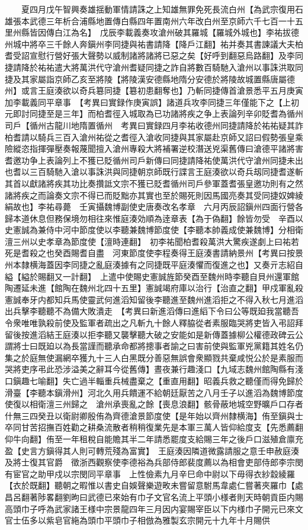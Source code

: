 　　夏四月戊午智興奏雄揺動軍情請誅之上知雄無罪免死長流白州【為武宗復用石雄張本武德三年析合浦縣地置傳白縣四年置南州六年改白州至京師六千七百一十五里州縣皆因傳白江為名】　戊辰李載義奏攻滄州破其羅城【羅城外城也】李祐拔德州城中將卒三千餘人奔鎭州李同捷與祐書請降【降戶江翻】祐并奏其書諫議大夫柏耆受詔宣慰行營好張大聲勢以威制諸將諸將已惡之矣【好呼到翻惡烏路翻】及李同捷請降於祐祐遣大將萬洪代守滄州耆疑同捷之詐自將數百騎馳入滄州以事誅洪取同捷及其家屬詣京師乙亥至將陵【將陵漢安德縣地隋分安德於將陵故城置縣唐屬德州】或言王庭湊欲以奇兵簒同捷【簒初患翻奪也】乃斬同捷傳首滄景悉平五月庚寅加李載義同平章事　【考異曰實録作庚寅誤】諸道兵攻李同捷三年僅能下之【上初元即討同捷至是三年】而柏耆徑入城取為已功諸將疾之争上表論列辛卯貶耆為循州司戶【循州古龍川地隋置循州　考異曰實録四月李祐收德州同捷請降於祐祐疑其詐柏耆請以騎兵三百入滄州祐從之耆徑入滄收同捷與其家屬赴京師又詔曰假勢張皇乘險縱恣指揮彈壓奏報蔑聞擅入滄州專殺大將補署逆校潛送兇渠舊傳曰滄德平諸將害耆邀功争上表論列上不獲已貶循州司戶新傳曰同捷請降祐使萬洪代守滄州同捷未出也耆以三百騎馳入滄以事誅洪與同捷朝京師既行諜言王庭湊欲以奇兵刼同捷耆遂斬其首以獻諸將疾其功比奏攢詆文宗不獲已貶耆循州司戶參軍蓋耆張皇邀功則有之然諸將疾之而論奏文宗不得已而貶黜亦其實也至於賜死則因馬國亮奏其受同捷奴婢綾絹故也】李祐尋薨　壬寅攝魏博副使史唐奏改名孝章　六月丙辰詔鎭州四面行營各歸本道休息但務保境勿相往來惟庭湊効順為逹章表【為于偽翻】餘皆勿受　辛酉以史憲誠為兼侍中河中節度使以李聽兼魏博節度使【李聽本帥義成使兼魏博】分相衛澶三州以史孝章為節度使【澶時連翻】　初李祐聞柏耆殺萬洪大驚疾遂劇上曰祐若死是耆殺之也癸酉賜耆自盡　河東節度使李程奏得王庭湊書請納景州【考異曰按景州本隸横海蓋因李同捷之亂庭湊據有之同捷既平庭湊懼而復進之也】又奏亓志紹自縊【縊於賜翻又一計翻】　上遣中使賜史憲誠旌節癸酉至魏州時李聽自貝州還軍館陶遷延未進【館陶在魏州北四十五里】憲誠竭府庫以治行【治直之翻】甲戍軍亂殺憲誠奉牙内都知兵馬使靈武何進滔知留後李聽進至魏州進滔拒之不得入秋七月進滔出兵擊李聽聽不為備大敗潰走　【考異曰新進滔傳曰進縚下令曰公等既廹我當聽吾令衆唯唯孰殺前使及監軍者疏出之凡斬九十餘人釋脇從者素服臨哭將吏皆入弔詔拜留後按進滔結王庭湊以拒李聽又襲擊聽大破之安能如是新傳蓋據柳公權德政碑云公謂將士曰既廹以為長當謹而聽承命都將摠事者諭之曰害前使與監軍兇黨籍其姓名仍集之於庭無使漏網卒獲九十三人白黑既分善惡無誤會衆顯戮共棄咸悦公於是素服而哭將吏序弔此恐涉溢美之辭耳今從舊傳】晝夜兼行趣淺口【九域志魏州館陶縣有淺口鎭趣七喻翻】失亡過半輜重兵械盡棄之【重直用翻】昭義兵救之聽僅而得免歸於滑臺【李聽本鎭滑州】河北久用兵饋運不給朝廷厭苦之八月壬子以進滔為魏博節度使復以相衛澶三州歸之　滄州承喪亂之餘【喪息浪翻】骸骨蔽地城空野曠戶口存者什無三四癸丑以衛尉卿殷侑為齊德滄景節度使【是年始以齊州隸横海】侑至鎭與士卒同甘苦招撫百姓勸之耕桑流散者稍稍復業先是本軍三萬人皆仰給度支【先悉薦翻仰牛向翻】侑至一年租稅自能贍其半二年請悉罷度支給賜三年之後戶口滋殖倉廪充盈【史言方鎭得其人則可轉荒殘為富實】　王庭湊因隣道微露請服之意壬申赦庭湊及將士復其官爵　徵浙西觀察使李德裕為兵部侍郎裴度薦以為相會吏部侍郎李宗閔有宦官之助甲戍以宗閔同平章事　上性儉素九月辛巳命中尉以下毋得衣紗縠綾羅【衣於既翻】聽朝之暇惟以書史自娛聲樂遊畋未嘗留意駙馬韋處仁嘗著夾羅巾【處昌呂翻著陟畧翻劉昫曰武德已來始有巾子文官名流上平頭小様者則天時朝貢臣内賜高頭巾子呼為武家諸王様中宗景龍四年三月因内宴賜宰臣以下内様巾子開元已來文官士伍多以紫皂官絁為頭巾平頭巾子相倣為雅製玄宗開元十九年十月賜供